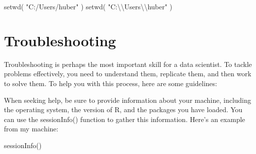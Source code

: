 \documentclass[
  12pt,
  oneside]{book}
\newenvironment{Shaded}{\begin{snugshade}}{\end{snugshade}}
\newcommand{\FunctionTok}[1]{\textcolor[rgb]{0.00,0.00,0.00}{#1}}
\newcommand{\NormalTok}[1]{#1}
\newcommand{\SpecialCharTok}[1]{\textcolor[rgb]{0.00,0.00,0.00}{#1}}
\newcommand{\StringTok}[1]{\textcolor[rgb]{0.31,0.60,0.02}{#1}}
\theoremstyle{definition}
\theoremstyle{definition}
\theoremstyle{definition}
\theoremstyle{definition}
\theoremstyle{remark}
\begin{document}
\begin{Shaded}
\begin{Highlighting}[]
\FunctionTok{setwd}\NormalTok{( }\StringTok{"C:/Users/huber"}\NormalTok{ )}
\FunctionTok{setwd}\NormalTok{( }\StringTok{"C:}\SpecialCharTok{\textbackslash{}\textbackslash{}}\StringTok{Users}\SpecialCharTok{\textbackslash{}\textbackslash{}}\StringTok{huber"}\NormalTok{ )}
\end{Highlighting}
\end{Shaded}

\hypertarget{troubleshooting}{%
\section{Troubleshooting}\label{troubleshooting}}

Troubleshooting is perhaps the most important skill for a data scientist. To tackle problems effectively, you need to understand them, replicate them, and then work to solve them. To help you with this process, here are some guidelines:

When seeking help, be sure to provide information about your machine, including the operating system, the version of R, and the packages you have loaded. You can use the sessionInfo() function to gather this information. Here's an example from my machine:

\begin{Shaded}
\begin{Highlighting}[]
\FunctionTok{sessionInfo}\NormalTok{()}
\end{Highlighting}
\end{Shaded}
\end{document}
